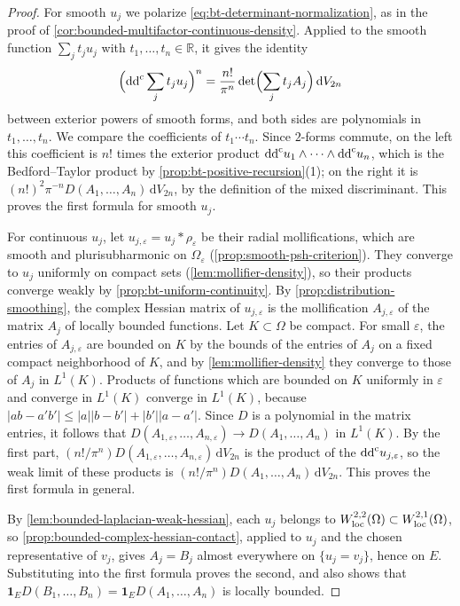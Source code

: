\begin{proof}
For smooth $u_j$ we polarize \eqref{eq:bt-determinant-normalization}, as in the proof of \cref{cor:bounded-multifactor-continuous-density}. Applied to the smooth function $\sum_jt_ju_j$ with $t_1,\ldots,t_n\in\mathbb R$, it gives the identity
\[
 \Bigl(\mathrm{dd}^{\mathrm{c}}\sum_jt_ju_j\Bigr)^n=\frac{n!}{\pi^n}\det\Bigl(\sum_jt_jA_j\Bigr)\,\mathrm dV_{2n}
\]
between exterior powers of smooth forms, and both sides are polynomials in $t_1,\ldots,t_n$. We compare the coefficients of $t_1\cdots t_n$. Since $2$-forms commute, on the left this coefficient is $n!$ times the exterior product $\mathrm{dd}^{\mathrm{c}} u_1\wedge\cdots\wedge\mathrm{dd}^{\mathrm{c}} u_n$, which is the Bedford--Taylor product by \cref{prop:bt-positive-recursion}(1); on the right it is $(n!)^2\pi^{-n}D(A_1,\dots,A_n)\,\mathrm dV_{2n}$, by the definition of the mixed discriminant. This proves the first formula for smooth $u_j$.

For continuous $u_j$, let $u_{j,\varepsilon}=u_j*\rho_\varepsilon$ be their radial mollifications, which are smooth and plurisubharmonic on $\Omega_\varepsilon$ (\cref{prop:smooth-psh-criterion}). They converge to $u_j$ uniformly on compact sets (\cref{lem:mollifier-density}), so their products converge weakly by \cref{prop:bt-uniform-continuity}. By \cref{prop:distribution-smoothing}, the complex Hessian matrix of $u_{j,\varepsilon}$ is the mollification $A_{j,\varepsilon}$ of the matrix $A_j$ of locally bounded functions. Let $K\subset\Omega$ be compact. For small $\varepsilon$, the entries of $A_{j,\varepsilon}$ are bounded on $K$ by the bounds of the entries of $A_j$ on a fixed compact neighborhood of $K$, and by \cref{lem:mollifier-density} they converge to those of $A_j$ in $L^1(K)$. Products of functions which are bounded on $K$ uniformly in $\varepsilon$ and converge in $L^1(K)$ converge in $L^1(K)$, because $|ab-a'b'|\leq|a||b-b'|+|b'||a-a'|$. Since $D$ is a polynomial in the matrix entries, it follows that $D(A_{1,\varepsilon},\dots,A_{n,\varepsilon})\to D(A_1,\dots,A_n)$ in $L^1(K)$. By the first part, $(n!/\pi^n)D(A_{1,\varepsilon},\dots,A_{n,\varepsilon})\,\mathrm dV_{2n}$ is the product of the $\mathrm{dd}^{\mathrm{c}} u_{j,\varepsilon}$, so the weak limit of these products is $(n!/\pi^n)D(A_1,\dots,A_n)\,\mathrm dV_{2n}$. This proves the first formula in general.

By \cref{lem:bounded-laplacian-weak-hessian}, each $u_j$ belongs to $W^{2,2}_{\mathrm{loc}}(\Omega)\subset W^{2,1}_{\mathrm{loc}}(\Omega)$, so \cref{prop:bounded-complex-hessian-contact}, applied to $u_j$ and the chosen representative of $v_j$, gives $A_j=B_j$ almost everywhere on $\{u_j=v_j\}$, hence on $E$. Substituting into the first formula proves the second, and also shows that $\mathbf1_ED(B_1,\dots,B_n)=\mathbf1_ED(A_1,\dots,A_n)$ is locally bounded.
\end{proof}

